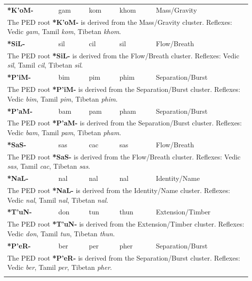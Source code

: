 \begin{longtable}{p{} p{} p{} p{} p{}}
\textbf{*K'oM-} & gam & kom & khom & Mass/Gravity \\ 
\multicolumn{5}{p{\textwidth}}{\small The PED root \textbf{*K'oM-} is derived from the Mass/Gravity cluster. Reflexes: Vedic \textit{gam}, Tamil \textit{kom}, Tibetan \textit{khom}. } \\ \addlinespace 
\textbf{*SiL-} & sil & cil & sil & Flow/Breath \\ 
\multicolumn{5}{p{\textwidth}}{\small The PED root \textbf{*SiL-} is derived from the Flow/Breath cluster. Reflexes: Vedic \textit{sil}, Tamil \textit{cil}, Tibetan \textit{sil}. } \\ \addlinespace 
\textbf{*P'iM-} & bim & pim & phim & Separation/Burst \\ 
\multicolumn{5}{p{\textwidth}}{\small The PED root \textbf{*P'iM-} is derived from the Separation/Burst cluster. Reflexes: Vedic \textit{bim}, Tamil \textit{pim}, Tibetan \textit{phim}. } \\ \addlinespace 
\textbf{*P'aM-} & bam & pam & pham & Separation/Burst \\ 
\multicolumn{5}{p{\textwidth}}{\small The PED root \textbf{*P'aM-} is derived from the Separation/Burst cluster. Reflexes: Vedic \textit{bam}, Tamil \textit{pam}, Tibetan \textit{pham}. } \\ \addlinespace 
\textbf{*SaS-} & sas & cac & sas & Flow/Breath \\ 
\multicolumn{5}{p{\textwidth}}{\small The PED root \textbf{*SaS-} is derived from the Flow/Breath cluster. Reflexes: Vedic \textit{sas}, Tamil \textit{cac}, Tibetan \textit{sas}. } \\ \addlinespace 
\textbf{*NaL-} & nal & nal & nal & Identity/Name \\ 
\multicolumn{5}{p{\textwidth}}{\small The PED root \textbf{*NaL-} is derived from the Identity/Name cluster. Reflexes: Vedic \textit{nal}, Tamil \textit{nal}, Tibetan \textit{nal}. } \\ \addlinespace 
\textbf{*T'uN-} & don & tun & thun & Extension/Timber \\ 
\multicolumn{5}{p{\textwidth}}{\small The PED root \textbf{*T'uN-} is derived from the Extension/Timber cluster. Reflexes: Vedic \textit{don}, Tamil \textit{tun}, Tibetan \textit{thun}. } \\ \addlinespace 
\textbf{*P'eR-} & ber & per & pher & Separation/Burst \\ 
\multicolumn{5}{p{\textwidth}}{\small The PED root \textbf{*P'eR-} is derived from the Separation/Burst cluster. Reflexes: Vedic \textit{ber}, Tamil \textit{per}, Tibetan \textit{pher}. } \\ \addlinespace 

\end{longtable}
